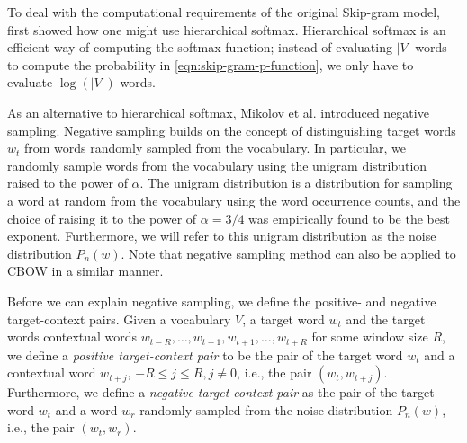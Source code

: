 To deal with the computational requirements of the original Skip-gram model, \cite{mikolov2013b} first showed how one might use hierarchical softmax. Hierarchical softmax is an efficient way of computing the softmax function; instead of evaluating $|V|$ words to compute the probability in \cref{eqn:skip-gram-p-function}, we only have to evaluate $\log \left( |V| \right)$ words.

As an alternative to hierarchical softmax, Mikolov et al. introduced negative sampling. Negative sampling builds on the concept of distinguishing target words $w_t$ from words randomly sampled from the vocabulary. In particular, we randomly sample words from the vocabulary using the unigram distribution raised to the power of $\alpha$. The unigram distribution is a distribution for sampling a word at random from the vocabulary using the word occurrence counts, and the choice of raising it to the power of $\alpha = 3/4$ was empirically found to be the best exponent. Furthermore, we will refer to this unigram distribution as the noise distribution $P_n(w)$. Note that negative sampling method can also be applied to CBOW in a similar manner.

Before we can explain negative sampling, we define the positive- and negative target-context pairs. Given a vocabulary $V$, a target word $w_t$ and the target words contextual words $w_{t-R}, \ldots, w_{t-1}, w_{t+1}, \ldots, w_{t+R}$ for some window size $R$, we define a \textit{positive target-context pair} to be the pair of the target word $w_t$ and a contextual word $w_{t+j}$, $-R \leq j \leq R, j \neq 0$, i.e., the pair $\left( w_t, w_{t+j} \right)$. Furthermore, we define a \textit{negative target-context pair} as the pair of the target word $w_t$ and a word $w_r$ randomly sampled from the noise distribution $P_n(w)$, i.e., the pair $\left( w_t, w_r \right)$.

